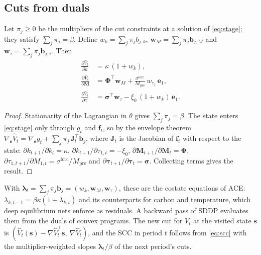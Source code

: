 \subsection{Cuts from duals}

\begin{proposition}
\label{prop:gradient}
Let $\pi_j \ge 0$ be the multipliers of the cut constraints at a solution of \eqref{eq:stage}; they satisfy $\sum_j \pi_j = \beta$. Define $w_k = \sum_j \pi_j b_{j,k}$, $\bm{w}_M = \sum_j \pi_j \bm{b}_{j,M}$ and $\bm{w}_\tau = \sum_j \pi_j \bm{b}_{j,\tau}$. Then
\begin{align}
    \frac{\partial \hat V_t}{\partial k} &= \kappa\,(1 + w_k), \\
    \frac{\partial \hat V_t}{\partial \bm{M}} &= \bm{\Phi}^\top \bm{w}_M + \frac{\sigma^{\text{forc}}}{M_{\text{pre}}}\, w_{\tau_1}\, \bm{e}_1, \\
    \frac{\partial \hat V_t}{\partial \bm{\tau}} &= \bm{\sigma}^\top \bm{w}_\tau - \xi_0\,(1 + w_k)\,\bm{e}_1 .
\end{align}
\end{proposition}

\begin{proof}
Stationarity of the Lagrangian in $\theta$ gives $\sum_j \pi_j = \beta$. The state enters \eqref{eq:stage} only through $g_t$ and $\bm{f}_t$, so by the envelope theorem $\nabla_{\bm{s}} \hat V_t = \nabla_{\bm{s}} g_t + \sum_j \pi_j\, \bm{J}_t^\top \bm{b}_j$, where $\bm{J}_t$ is the Jacobian of $\bm{f}_t$ with respect to the state: $\partial k_{t+1}/\partial k_t = \kappa$, $\partial k_{t+1}/\partial \tau_{1,t} = -\xi_0$, $\partial \bm{M}_{t+1}/\partial \bm{M}_t = \bm{\Phi}$, $\partial \tau_{1,t+1}/\partial M_{1,t} = \sigma^{\text{forc}}/M_{\text{pre}}$ and $\partial \bm{\tau}_{t+1}/\partial\bm{\tau}_t = \bm{\sigma}$. Collecting terms gives the result.
\end{proof}

With $\bm{\lambda}_t = \sum_j \pi_j \bm{b}_j = (w_k, \bm{w}_M, \bm{w}_\tau)$, these are the costate equations of ACE: $\lambda_{k,t-1} = \beta\kappa(1 + \lambda_{k,t})$ and its counterparts for carbon and temperature, which deep equilibrium nets enforce as residuals. A backward pass of SDDP evaluates them from the duals of convex programs. The new cut for $V_t$ at the visited state $\bm{s}$ is $(\hat V_t(\bm{s}) - \nabla\hat V_t^\top \bm{s},\ \nabla \hat V_t)$, and the SCC in period $t$ follows from \eqref{eq:scc} with the multiplier-weighted slopes $\bm{\lambda}_t / \beta$ of the next period's cuts.

